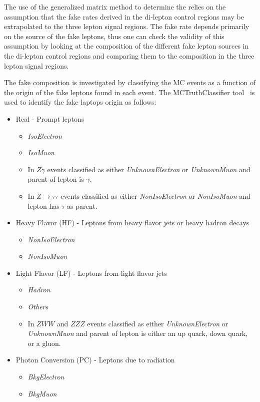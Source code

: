 The use of the generalized matrix method to determine the 
relies on the assumption that the 
fake rates derived in the di-lepton control regions may be extrapolated to the three lepton signal regions.  
The fake rate depends primarily on the source of the fake leptons, thus
one can check the validity of this assumption by looking at the composition of the
different fake lepton sources in the di-lepton control regions and comparing 
them to the
composition in the three lepton signal regions. 

The fake composition is investigated by classifying the MC events as a function of the origin of the fake leptons found in each event.  The MCTruthClassifier tool~\cite{MCtruthclassifier:twiki} is used
to identify the fake laptops origin as follows:

\begin{itemize}
\item Real - Prompt leptons
		\begin{itemize}
		\item \emph{IsoElectron} 
		\item \emph{IsoMuon}
		\item In $Z\gamma$ events classified as either \emph{UnknownElectron} or \emph{UnknownMuon} and parent of lepton is $\gamma$.
		\item In $Z\rightarrow\tau\tau$ events classified as either \emph{NonIsoElectron} or \emph{NonIsoMuon} and lepton has $\tau$ as parent.
		\end{itemize}
\item Heavy Flavor (HF) - Leptons from heavy flavor jets or heavy hadron decays
		\begin{itemize}
		\item \emph{NonIsoElectron} 
		\item \emph{NonIsoMuon}
		\end{itemize}
\item Light Flavor (LF) -  Leptons from light flavor jets
		\begin{itemize}
		\item \emph{Hadron} 
		\item \emph{Others}
		\item In $ZWW$ and $ZZZ$ events classified as either \emph{UnknownElectron} or \emph{UnknownMuon} and parent of lepton is either an up quark, down quark, or a gluon.
		\end{itemize}
\item Photon Conversion (PC)  - Leptons due to radiation
		\begin{itemize}
		\item \emph{BkgElectron} 
		\item \emph{BkgMuon}
		\end{itemize}

\end{itemize}

